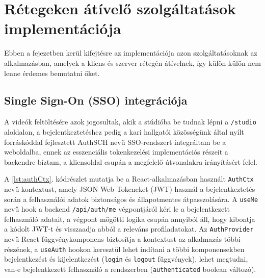 \chapter{Rétegeken átívelő szolgáltatások implementációja}

Ebben a fejezetben kerül kifejtésre az implementációja azon szolgáltatásoknak az alkalmazásban, amelyek a kliens és szerver rétegén átívelnek, így külön-külön nem lenne érdemes bemutatni őket.

\section{Single Sign-On (SSO) integrációja}

A videók feltöltésére azok jogosultak, akik a stúdióba be tudnak lépni a \verb|/studio| aloldalon, a bejelentkeztetéshez pedig a kari hallgatói közösségünk által nyílt forráskóddal fejlesztett AuthSCH nevű SSO-rendszert integráltam be a weboldalba, ennek az esszenciális tokenkezelési implementációs részeit a backendre bíztam, a kliensoldal csupán a megfelelő útvonalakra irányításért felel.

A \ref{lst:authCtx}. kódrészlet mutatja be a React-alkalmazásban használt \verb|AuthCtx| nevű kontextust, amely JSON Web Tokeneket (JWT)\cite{jwt} használ a bejelentkeztetés során a felhasználói adatok biztonságos és állapotmentes átpasszolására. A \verb|useMe| nevű hook a backend \verb|/api/auth/me| végpontjáról kéri le a bejelentkezett felhasználó adatait, a végpont mögötti logika csupán annyiból áll, hogy kibontja a kódolt JWT-t és visszaadja abból a releváns profiladatokat. Az \verb|AuthProvider| nevű React-függvénykomponens biztosítja a kontextust az alkalmazás többi részének, a \verb|useAuth| hookon keresztül lehet indítani a többi komponensekben bejelentkezést és kijelentkezést (\verb|login| és \verb|logout| függvények), lehet megtudni, van-e bejelentkezett felhasználó a rendszerben (\verb|authenticated| boolean változó).


